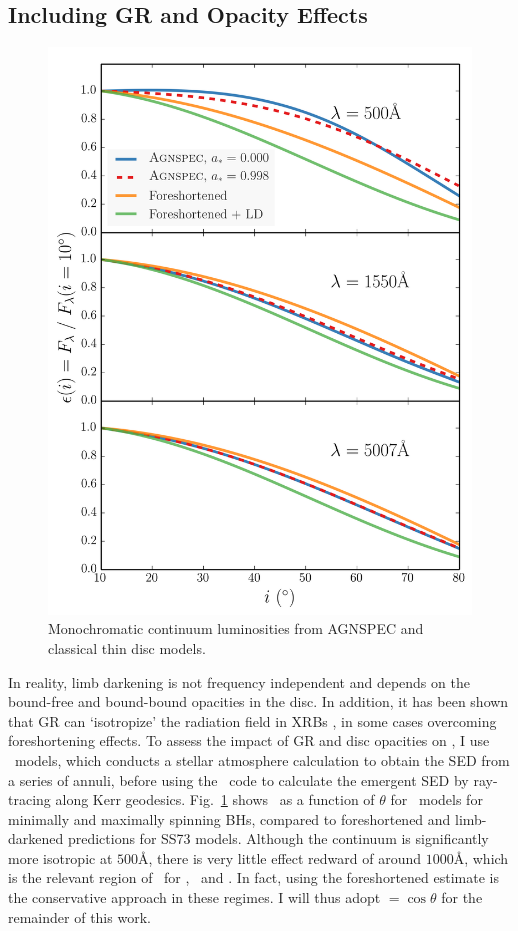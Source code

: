 \subsection{Including GR and Opacity Effects}

\begin{figure}
\centering
\includegraphics[width=1.0\textwidth]{figures/ewpaper/agnspec.png}
\caption
{
Monochromatic continuum luminosities from AGNSPEC and classical thin disc
models.
}
\label{fig:agnspec_disc}
\end{figure} 


\noindent
In reality, limb darkening is not frequency independent and 
depends on the bound-free and bound-bound opacities in the disc.
In addition, it has been shown that GR can `isotropize' the radiation
field in XRBs \citep{zhang1997,munozdarias2013}, in some cases overcoming
foreshortening effects. To assess the impact of GR and disc opacities
on \ept, I use \agn\ models, which conducts a stellar atmosphere calculation
to obtain the SED from a series of annuli, before using the \kerrtrans\ code 
to calculate the emergent SED by ray-tracing along Kerr geodesics.
Fig.~\ref{fig:agnspec_disc} shows \ept\ as a function of 
$\theta$ for \agn\ models for minimally and maximally spinning BHs,
compared to foreshortened and limb-darkened predictions for SS73 models.
Although the continuum is significantly more isotropic at $500$\AA,
there is very little effect redward of around $1000$\AA, which is the relevant
region of \ept\ for \oiiifull, \civline\ and \mgline . 
In fact, using the foreshortened estimate is 
the conservative approach in these regimes. I will thus adopt \ept$=\cos \theta$
for the remainder of this work.


